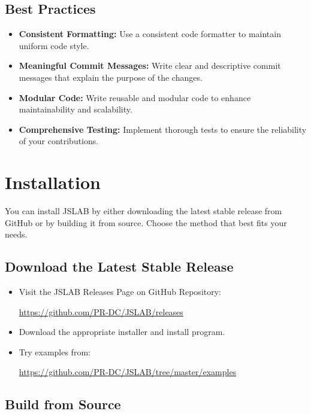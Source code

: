 \documentclass[12pt,a4paper]{article}
\begin{document}
\subsection{Best Practices}
\begin{itemize}
  \item \textbf{Consistent Formatting:} Use a consistent code formatter to maintain uniform code style.
  
  \item \textbf{Meaningful Commit Messages:} Write clear and descriptive commit messages that explain the purpose of the changes.
  
  \item \textbf{Modular Code:} Write reusable and modular code to enhance maintainability and scalability.
  
  \item \textbf{Comprehensive Testing:} Implement thorough tests to ensure the reliability of your contributions.
\end{itemize}


\section{Installation}

You can install JSLAB by either downloading the latest stable release from GitHub or by building it from source. Choose the method that best fits your needs.

\subsection{Download the Latest Stable Release}
\begin{itemize}
  \item Visit the JSLAB Releases Page on GitHub Repository: 
  
  \url{https://github.com/PR-DC/JSLAB/releases} 
  
  \item Download the appropriate installer and install program.

  \item Try examples from:

  \url{https://github.com/PR-DC/JSLAB/tree/master/examples}

\end{itemize}

\subsection{Build from Source}
\end{document}

